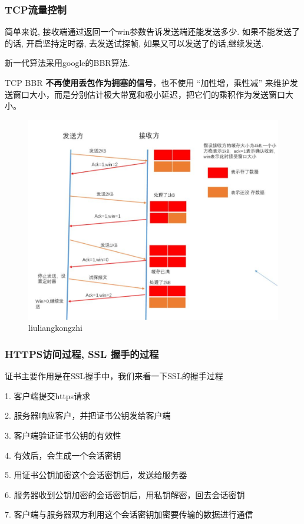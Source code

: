 \documentclass[UTF8]{ctexart}
\begin{document}
\subsubsection{TCP流量控制}
简单来说, 接收端通过返回一个win参数告诉发送端还能发送多少. 如果不能发送了的话, 开启坚持定时器, 去发送试探帧, 如果又可以发送了的话,继续发送. \par
新一代算法采用google的BBR算法.

TCP BBR \textbf{不再使用丢包作为拥塞的信号}，也不使用 “加性增，乘性减” 来维护发送窗口大小，而是分别估计极大带宽和极小延迟，把它们的乘积作为发送窗口大小。 
\begin{figure}
	\centering
	\includegraphics[width=0.7\linewidth]{figures/liuliangkongzhi.png}
	\caption{liuliangkongzhi}
	\label{fig:liuliangkongzhi}
\end{figure}
\subsubsection{HTTPS访问过程, SSL 握手的过程}
证书主要作用是在SSL握手中，我们来看一下SSL的握手过程

1. 客户端提交https请求

2. 服务器响应客户，并把证书公钥发给客户端

3. 客户端验证证书公钥的有效性

4. 有效后，会生成一个会话密钥

5. 用证书公钥加密这个会话密钥后，发送给服务器

6. 服务器收到公钥加密的会话密钥后，用私钥解密，回去会话密钥

7. 客户端与服务器双方利用这个会话密钥加密要传输的数据进行通信
\end{document}
